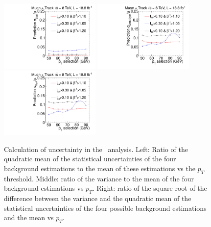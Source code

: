 \begin{figure}
\begin{center}
\includegraphics[clip=true, trim=0.0cm 0cm 3.0cm 0cm,width=0.44\textwidth]{figures/tkmu/Systematics_Data8TeV_pT_Stat}
\includegraphics[clip=true, trim=0.0cm 0cm 3.0cm 0cm,width=0.44\textwidth]{figures/tkmu/Systematics_Data8TeV_pT_Sum} \\
\includegraphics[clip=true, trim=0.0cm 0cm 3.0cm 0cm,width=0.44\textwidth]{figures/tkmu/Systematics_Data8TeV_pT_Syst}
\caption[Statistical and systematic uncertainty in the background prediction for different sets of thresholds in the \tktof\ analysis.]
{Calculation of uncertainty in the \tktof\ analysis.
Left: Ratio of the quadratic
mean of the statistical uncertainties of the four background
estimations to the mean of these estimations vs
the $p_T$ threshold. Middle: ratio of the variance to the mean of the four
background estimations vs $p_T$. Right: ratio of the
square root of the difference between the variance and the quadratic
mean of the statistical uncertainties  of the four possible background
estimations and the mean vs $p_T$.}
\label{fig:TkMuUnc}
\end{center}
\end{figure}

